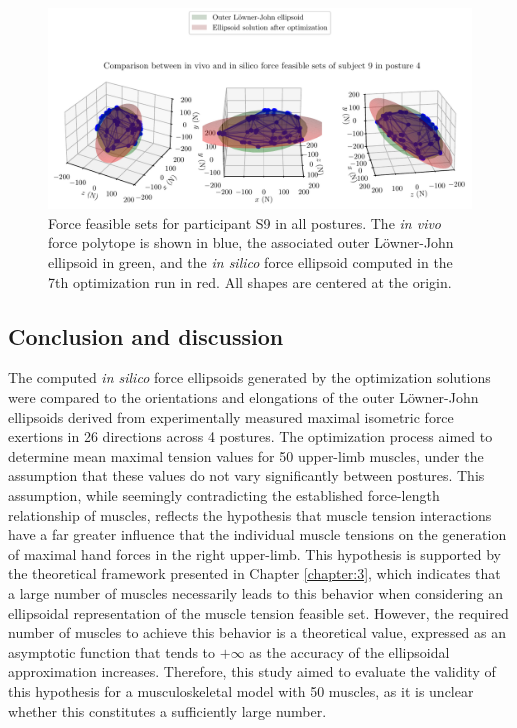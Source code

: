 \begin{figure}[!htb]
\begin{minipage}{1\linewidth}
        \captionsetup{justification=centering}
        \centering
        \includegraphics[trim=0 0 0 60, clip, width=0.8\linewidth]{img/chapter_5/subject_104_solution_7_posture_4.pdf}
    \end{minipage}
    \caption{Force feasible sets for participant S9 in all postures. The \emph{in vivo} force polytope is shown in blue, the associated outer Löwner-John ellipsoid in green, and the \emph{in silico} force ellipsoid computed in the 7th optimization run in red. All shapes are centered at the origin.}
    \label{fig:sub9_7thsol}
\end{figure}

\subsection{Conclusion and discussion}
The computed \emph{in silico} force ellipsoids generated by the optimization solutions were compared to the orientations and elongations of the outer Löwner-John ellipsoids derived from experimentally measured maximal isometric force exertions in 26 directions across 4 postures. The optimization process aimed to determine mean maximal tension values for 50 upper-limb muscles, under the assumption that these values do not vary significantly between postures. This assumption, while seemingly contradicting the established force-length relationship of muscles, reflects the hypothesis that muscle tension interactions have a far greater influence that the individual muscle tensions on the generation of maximal hand forces in the right upper-limb. This hypothesis is supported by the theoretical framework presented in Chapter \ref{chapter:3}, which indicates that a large number of muscles necessarily leads to this behavior when considering an ellipsoidal representation of the muscle tension feasible set. However, the required number of muscles to achieve this behavior is a theoretical value, expressed as an asymptotic function that tends to $+\infty$ as the accuracy of the ellipsoidal approximation increases. Therefore, this study aimed to evaluate the validity of this hypothesis for a musculoskeletal model with 50 muscles, as it is unclear whether this constitutes a sufficiently large number.

